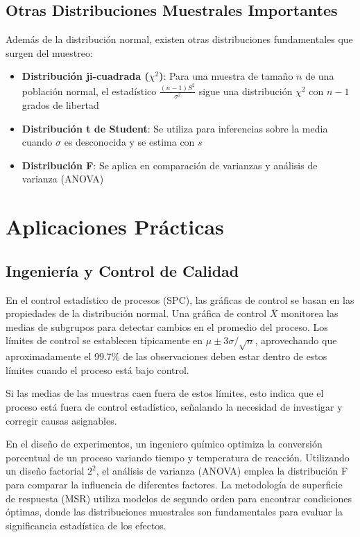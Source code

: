 \subsection{Otras Distribuciones Muestrales Importantes}

\begin{remark}
Además de la distribución normal, existen otras distribuciones fundamentales que surgen del muestreo:
\begin{itemize}
    \item \textbf{Distribución ji-cuadrada ($\chi^2$)}: Para una muestra de tamaño $n$ de una población normal, el estadístico $\frac{(n-1)S^2}{\sigma^2}$ sigue una distribución $\chi^2$ con $n-1$ grados de libertad
    \item \textbf{Distribución t de Student}: Se utiliza para inferencias sobre la media cuando $\sigma$ es desconocida y se estima con $s$
    \item \textbf{Distribución F}: Se aplica en comparación de varianzas y análisis de varianza (ANOVA)
\end{itemize}
\end{remark}

\section{Aplicaciones Prácticas}

\subsection{Ingeniería y Control de Calidad}

\begin{example}
En el control estadístico de procesos (SPC), las gráficas de control se basan en las propiedades de la distribución normal. Una gráfica de control $\bar{X}$ monitorea las medias de subgrupos para detectar cambios en el promedio del proceso. Los límites de control se establecen típicamente en $\mu \pm 3\sigma/\sqrt{n}$, aprovechando que aproximadamente el 99.7\% de las observaciones deben estar dentro de estos límites cuando el proceso está bajo control.

Si las medias de las muestras caen fuera de estos límites, esto indica que el proceso está fuera de control estadístico, señalando la necesidad de investigar y corregir causas asignables.
\end{example}

\begin{example}
En el diseño de experimentos, un ingeniero químico optimiza la conversión porcentual de un proceso variando tiempo y temperatura de reacción. Utilizando un diseño factorial $2^2$, el análisis de varianza (ANOVA) emplea la distribución F para comparar la influencia de diferentes factores. La metodología de superficie de respuesta (MSR) utiliza modelos de segundo orden para encontrar condiciones óptimas, donde las distribuciones muestrales son fundamentales para evaluar la significancia estadística de los efectos.
\end{example}


